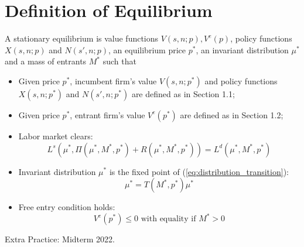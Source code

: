 \documentclass[12pt]{article}
\begin{document}


\section{Definition of Equilibrium}
A stationary equilibrium is value functions $V(s,n;p), V^e(p)$, policy functions $X(s,n;p)$ and $N(s',n;p)$, an equilibrium price $p^*$, an invariant distribution $\mu^*$ and a mass of entrants $M^*$ such that
\begin{itemize}
	\item Given price $p^*$, incumbent firm's value $V(s,n;p^*)$ and policy functions $X(s,n;p^*)$ and $N(s',n;p^*)$ are defined as in Section 1.1;
	\item Given price $p^*$, entrant firm's value $V^e(p^*)$ are defined as in Section 1.2;
	\item Labor market clears:
	\begin{equation}
		L^s(\mu^*, \Pi(\mu^*, M^*, p^*) + R(\mu^*, M^*, p^*)) = L^d(\mu^*, M^*, p^*)
	\end{equation}
\item Invariant distribution $\mu^*$ is the fixed point of (\ref{eq:distribution_transition}):
\begin{equation}
	\mu^* = T(M^*, p^*) \mu^*
\end{equation}
\item Free entry condition holds:
\begin{equation}
	V^e(p^*) \leq 0 \text{ with equality if $M^* > 0$}
\end{equation}
\end{itemize}

Extra Practice: Midterm 2022.

	
\end{document}
